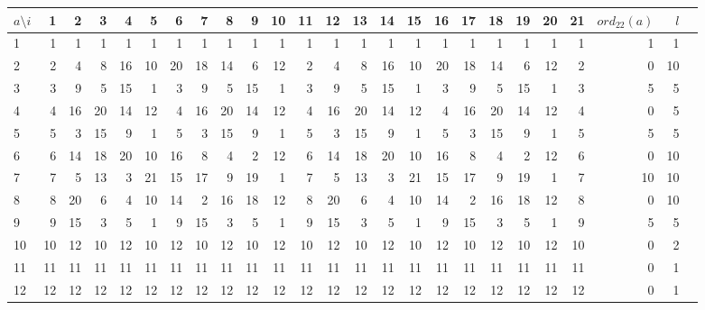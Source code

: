 \begin{refsegment}
\newpage
\begin{table}[ht]
\begin{center}
\begin{tabular}{|p{16 pt}||@{\:}r@{\:}|@{\:}r@{\:}|@{\:}r@{\:}|@{\:}r@{\:}|@{\:}r@{\:}|@{\:}r@{\:}|@{\:}r@{\:}|@{\:}r@{\:}|@{\:}r@{\:}|@{\:}r@{\:}|@{\:}r@{\:}|@{\:}r@{\:}|@{\:}r@{\:}|@{\:}r@{\:}|@{\:}r@{\:}|@{\:}r@{\:}|@{\:}r@{\:}|@{\:}r@{\:}|@{\:}r@{\:}|@{\:}r@{\:}|@{\:}r@{\:}||@{\:}r@{\:}|@{\:}r@{\:}|c|}
\hline
$a \setminus i$ & 1 & 2 & 3 & 4 & 5 & 6 & 7 & 8 & 9 & 10 & 11 & 12 & 13 & 14 & 15 & 16 & 17 & 18 & 19 & 20 & 21 & $ord_{22}(a)$ & $l$\\
\hline
\hline
1 & 1 & 1 & 1 & 1 & 1 & 1 & 1 & 1 & 1 & 1 & 1 & 1 & 1 & 1 & 1 & 1 & 1 & 1 & 1 & 1 & 1 & 1 & 1\\
\hline
2 & 2 & 4 & 8 & 16 & 10 & 20 & 18 & 14 & 6 & 12 & 2 & 4 & 8 & 16 & 10 & 20 & 18 & 14 & 6 & 12 & 2 & 0 & 10\\
\hline
3 & 3 & 9 & 5 & 15 & 1 & 3 & 9 & 5 & 15 & 1 & 3 & 9 & 5 & 15 & 1 & 3 & 9 & 5 & 15 & 1 & 3 & 5 & 5\\
\hline
4 & 4 & 16 & 20 & 14 & 12 & 4 & 16 & 20 & 14 & 12 & 4 & 16 & 20 & 14 & 12 & 4 & 16 & 20 & 14 & 12 & 4 & 0 & 5\\
\hline
5 & 5 & 3 & 15 & 9 & 1 & 5 & 3 & 15 & 9 & 1 & 5 & 3 & 15 & 9 & 1 & 5 & 3 & 15 & 9 & 1 & 5 & 5 & 5\\
\hline
6 & 6 & 14 & 18 & 20 & 10 & 16 & 8 & 4 & 2 & 12 & 6 & 14 & 18 & 20 & 10 & 16 & 8 & 4 & 2 & 12 & 6 & 0 & 10\\
\hline
7 & 7 & 5 & 13 & 3 & 21 & 15 & 17 & 9 & 19 & 1 & 7 & 5 & 13 & 3 & 21 & 15 & 17 & 9 & 19 & 1 & 7 & 10 & 10\\
\hline
8 & 8 & 20 & 6 & 4 & 10 & 14 & 2 & 16 & 18 & 12 & 8 & 20 & 6 & 4 & 10 & 14 & 2 & 16 & 18 & 12 & 8 & 0 & 10\\
\hline
9 & 9 & 15 & 3 & 5 & 1 & 9 & 15 & 3 & 5 & 1 & 9 & 15 & 3 & 5 & 1 & 9 & 15 & 3 & 5 & 1 & 9 & 5 & 5\\
\hline
10 & 10 & 12 & 10 & 12 & 10 & 12 & 10 & 12 & 10 & 12 & 10 & 12 & 10 & 12 & 10 & 12 & 10 & 12 & 10 & 12 & 10 & 0 & 2\\
\hline
11 & 11 & 11 & 11 & 11 & 11 & 11 & 11 & 11 & 11 & 11 & 11 & 11 & 11 & 11 & 11 & 11 & 11 & 11 & 11 & 11 & 11 & 0 & 1\\
\hline
12 & 12 & 12 & 12 & 12 & 12 & 12 & 12 & 12 & 12 & 12 & 12 & 12 & 12 & 12 & 12 & 12 & 12 & 12 & 12 & 12 & 12 & 0 & 1\\

\end{tabular}
\end{center}
\end{table}
\end{refsegment}
